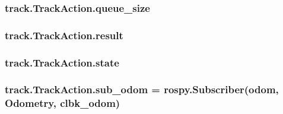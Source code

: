 \subsubsection[{\texorpdfstring{queue\+\_\+size}{queue_size}}]{\setlength{\rightskip}{0pt plus 5cm}track.\+Track\+Action.\+queue\+\_\+size\hspace{0.3cm}{\ttfamily [static]}}\hypertarget{classtrack_1_1TrackAction_a47112fa77bb24c45494449d781bd35c4}{}\label{classtrack_1_1TrackAction_a47112fa77bb24c45494449d781bd35c4}
\subsubsection[{\texorpdfstring{result}{result}}]{\setlength{\rightskip}{0pt plus 5cm}track.\+Track\+Action.\+result\hspace{0.3cm}{\ttfamily [static]}}\hypertarget{classtrack_1_1TrackAction_ae62bfb3233b566df94fde636d8d26877}{}\label{classtrack_1_1TrackAction_ae62bfb3233b566df94fde636d8d26877}
\subsubsection[{\texorpdfstring{state}{state}}]{\setlength{\rightskip}{0pt plus 5cm}track.\+Track\+Action.\+state\hspace{0.3cm}{\ttfamily [static]}}\hypertarget{classtrack_1_1TrackAction_a56031d0f135cf2d2f7c950325059f7bd}{}\label{classtrack_1_1TrackAction_a56031d0f135cf2d2f7c950325059f7bd}
\subsubsection[{\texorpdfstring{sub\+\_\+odom}{sub_odom}}]{\setlength{\rightskip}{0pt plus 5cm}track.\+Track\+Action.\+sub\+\_\+odom = rospy.\+Subscriber(\textquotesingle{}odom\textquotesingle{}, Odometry, {\bf clbk\+\_\+odom})\hspace{0.3cm}{\ttfamily [static]}}\hypertarget{classtrack_1_1TrackAction_a4cbc03d130bcf2203bc68f37d02dc4c5}{}\label{classtrack_1_1TrackAction_a4cbc03d130bcf2203bc68f37d02dc4c5}


